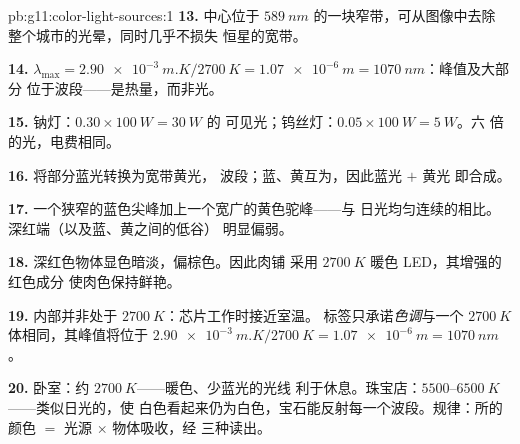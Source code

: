\begin{solution}{pb:g11:color-light-sources:1}
\textbf{13.} 中心位于 $\qty{589}{nm}$ 的一块窄带，可从图像中去除
整个城市的光晕，同时几乎不损失
恒星的宽带。

\textbf{14.} $\lambda_{\max} = \qty{2.90e-3}{m.K}/\qty{2700}{K} =
\qty{1.07e-6}{m} = \qty{1070}{nm}$：峰值及大部分
位于波段——是热量，而非光。

\textbf{15.} 钠灯：$0.30 \times \qty{100}{W} = \qty{30}{W}$ 的
可见光；钨丝灯：$0.05 \times \qty{100}{W} = \qty{5}{W}$。六
倍的光，电费相同。

\textbf{16.} 将部分蓝光转换为宽带黄光，
波段；蓝、黄互为，因此蓝光 $+$ 黄光
即合成。

\textbf{17.} 一个狭窄的蓝色尖峰加上一个宽广的黄色驼峰——与
日光均匀连续的相比。深红端（以及蓝、黄之间的低谷）
明显偏弱。

\textbf{18.} 深红色物体显色暗淡，偏棕色。因此肉铺
采用 $\qty{2700}{K}$ 暖色 LED，其增强的红色成分
使肉色保持鲜艳。

\textbf{19.} 内部并非处于 $\qty{2700}{K}$：芯片工作时接近室温。
标签只承诺\emph{色调}与一个
$\qty{2700}{K}$ 体相同，其峰值将位于
$\qty{2.90e-3}{m.K}/\qty{2700}{K} = \qty{1.07e-6}{m} = \qty{1070}{nm}$。

\textbf{20.} 卧室：约 $\qty{2700}{K}$——暖色、少蓝光的光线
利于休息。珠宝店：$5500$--$\qty{6500}{K}$——类似日光的，使
白色看起来仍为白色，宝石能反射每一个波段。规律：所的
颜色 $=$ 光源 $\times$ 物体吸收，经
三种读出。
\end{solution}
